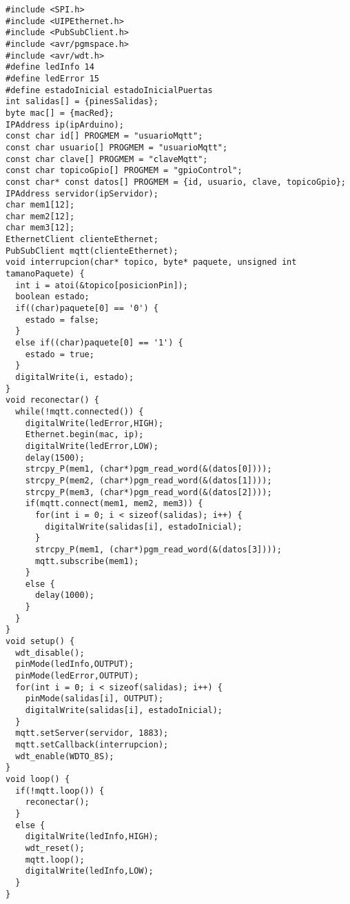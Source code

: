 \begin{lstlisting}[label=anx:programa_arduino_control]
#include <SPI.h>
#include <UIPEthernet.h>
#include <PubSubClient.h>
#include <avr/pgmspace.h>
#include <avr/wdt.h>
#define ledInfo 14
#define ledError 15
#define estadoInicial estadoInicialPuertas
int salidas[] = {pinesSalidas};
byte mac[] = {macRed};
IPAddress ip(ipArduino);
const char id[] PROGMEM = "usuarioMqtt";
const char usuario[] PROGMEM = "usuarioMqtt";
const char clave[] PROGMEM = "claveMqtt";
const char topicoGpio[] PROGMEM = "gpioControl";
const char* const datos[] PROGMEM = {id, usuario, clave, topicoGpio};
IPAddress servidor(ipServidor);
char mem1[12];
char mem2[12];
char mem3[12];
EthernetClient clienteEthernet;
PubSubClient mqtt(clienteEthernet);
void interrupcion(char* topico, byte* paquete, unsigned int tamanoPaquete) {
  int i = atoi(&topico[posicionPin]);
  boolean estado;
  if((char)paquete[0] == '0') {
    estado = false;
  }
  else if((char)paquete[0] == '1') {
    estado = true;
  }
  digitalWrite(i, estado);
}
void reconectar() {
  while(!mqtt.connected()) {
    digitalWrite(ledError,HIGH);
    Ethernet.begin(mac, ip);
    digitalWrite(ledError,LOW);
    delay(1500);
    strcpy_P(mem1, (char*)pgm_read_word(&(datos[0])));
    strcpy_P(mem2, (char*)pgm_read_word(&(datos[1])));
    strcpy_P(mem3, (char*)pgm_read_word(&(datos[2])));
    if(mqtt.connect(mem1, mem2, mem3)) {
      for(int i = 0; i < sizeof(salidas); i++) {
        digitalWrite(salidas[i], estadoInicial);
      }
      strcpy_P(mem1, (char*)pgm_read_word(&(datos[3])));
      mqtt.subscribe(mem1);
    }
    else {
      delay(1000);
    }
  }
}
void setup() {
  wdt_disable();
  pinMode(ledInfo,OUTPUT);
  pinMode(ledError,OUTPUT);
  for(int i = 0; i < sizeof(salidas); i++) {
    pinMode(salidas[i], OUTPUT);
    digitalWrite(salidas[i], estadoInicial);
  }
  mqtt.setServer(servidor, 1883);
  mqtt.setCallback(interrupcion);
  wdt_enable(WDTO_8S);
}
void loop() {
  if(!mqtt.loop()) {
    reconectar();
  }
  else {
    digitalWrite(ledInfo,HIGH);
    wdt_reset();
    mqtt.loop();
    digitalWrite(ledInfo,LOW);
  }
}
\end{lstlisting}
